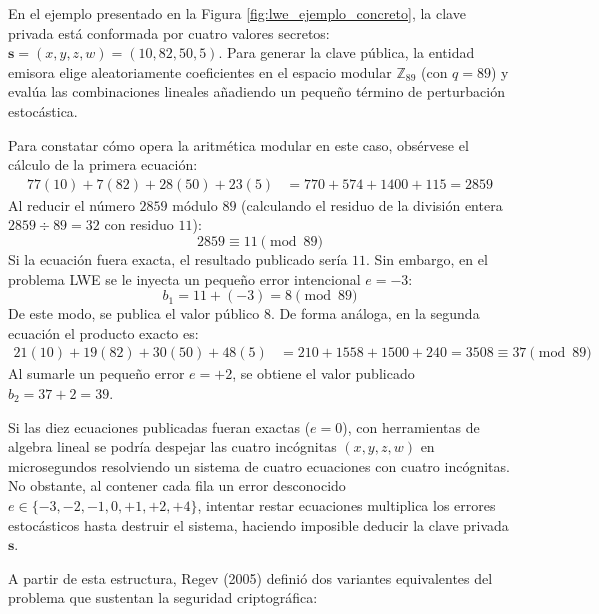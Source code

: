 En el ejemplo presentado en la Figura \ref{fig:lwe_ejemplo_concreto}, la clave privada está conformada por cuatro valores secretos: $\mathbf{s} = (x, y, z, w) = (10, 82, 50, 5)$. Para generar la clave pública, la entidad emisora elige aleatoriamente coeficientes en el espacio modular $\mathbb{Z}_{89}$ (con $q = 89$) y evalúa las combinaciones lineales añadiendo un pequeño término de perturbación estocástica. 

Para constatar cómo opera la aritmética modular en este caso, obsérvese el cálculo de la primera ecuación:
\begin{align*}
	77(10) + 7(82) + 28(50) + 23(5) &= 770 + 574 + 1400 + 115 = 2859
\end{align*}
Al reducir el número $2859$ módulo $89$ (calculando el residuo de la división entera $2859 \div 89 = 32$ con residuo $11$):
\begin{equation*}
	2859 \equiv 11 \pmod{89}
\end{equation*}
Si la ecuación fuera exacta, el resultado publicado sería $11$. Sin embargo, en el problema LWE se le inyecta un pequeño error intencional $e = -3$:
\begin{equation*}
	b_1 = 11 + (-3) = 8 \pmod{89}
\end{equation*}
De este modo, se publica el valor público $8$. De forma análoga, en la segunda ecuación el producto exacto es:
\begin{align*}
	21(10) + 19(82) + 30(50) + 48(5) &= 210 + 1558 + 1500 + 240 = 3508 \equiv 37 \pmod{89}
\end{align*}
Al sumarle un pequeño error  $e = +2$, se obtiene el valor publicado $b_2 = 37 + 2 = 39$.

Si las diez ecuaciones publicadas fueran exactas ($e = 0$), con herramientas de algebra lineal se podría despejar las cuatro incógnitas $(x, y, z, w)$ en microsegundos resolviendo un sistema de cuatro ecuaciones con cuatro incógnitas. No obstante, al contener cada fila un error desconocido $e \in \{-3, -2, -1, 0, +1, +2, +4\}$, intentar restar ecuaciones multiplica los errores estocásticos hasta destruir el sistema, haciendo imposible deducir la clave privada $\mathbf{s}$.

A partir de esta estructura, Regev (2005) definió dos variantes equivalentes del problema que sustentan la seguridad criptográfica:

